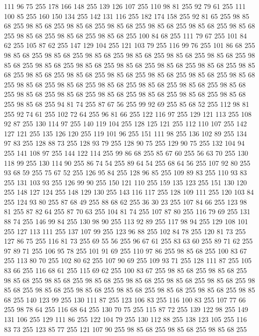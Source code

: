 111 96 75 255 178 166 148 255 139 126 107 255 110 98 81 255 92 79 61 255 111 100 85 255 160 150 134 255 142 131 116 255 182 174 158 255 92 81 65 255 98 85 68 255 98 85 68 255 98 85 68 255 98 85 68 255 98 85 68 255 98 85 68 255 98 85 68 255 98 85 68 255 98 85 68 255 98 85 68 255 100 84 68 255 111 79 67 255 101 84 62 255 105 87 62 255 147 129 104 255 121 103 79 255 116 99 76 255 101 86 68 255 98 85 68 255 98 85 68 255 98 85 68 255 98 85 68 255 98 85 68 255 98 85 68 255 98 85 68 255 98 85 68 255 98 85 68 255 98 85 68 255 98 85 68 255 98 85 68 255 98 85 68 255 98 85 68 255 98 85 68 255 98 85 68 255 98 85 68 255 98 85 68 255 98 85 68 255 98 85 68 255 98 85 68 255 98 85 68 255 98 85 68 255 98 85 68 255 98 85 68 255 98 85 68 255 98 85 68 255 98 85 68 255 98 85 68 255 98 85 68 255 98 85 68 255 98 85 68 255 94 81 74 255 87 67 56 255 99 92 69 255 85 68 52 255
112 98 81 255 92 74 61 255 102 72 64 255 96 81 66 255 122 116 97 255 129 121 113 255 108 92 87 255 130 114 97 255 140 119 104 255 128 125 121 255 112 110 107 255 142 127 121 255 135 126 120 255 119 101 96 255 151 111 98 255 136 102 89 255 134 97 83 255 128 88 73 255 128 93 79 255 128 90 75 255 129 90 75 255 132 104 94 255 141 108 97 255 144 122 114 255 99 86 68 255 85 67 60 255 56 63 70 255 130 118 99 255 130 114 90 255 86 74 54 255 89 64 54 255 68 64 56 255 107 92 80 255 93 68 59 255 75 67 52 255 126 95 84 255 128 96 85 255 109 89 83 255 110 93 83 255 131 103 93 255 126 99 90 255 150 121 110 255 159 135 123 255 151 130 120 255 148 127 124 255 148 129 130 255 143 116 117 255 128 109 111 255 120 103 84 255 124 93 80 255 87 68 49 255 88 68 62 255 36 30 23 255 107 84 66 255 123 98 81 255 87 82 64 255 87 70 63 255 104 81 74 255 107 87 80 255 116 79 69 255 131 88 74 255 146 99 84 255 130 98 90 255 113 92 89 255
117 98 94 255 129 108 101 255 127 113 111 255 137 107 99 255 123 96 88 255 102 84 78 255 120 81 73 255 127 86 75 255 116 81 73 255 69 55 56 255 96 67 61 255 83 63 60 255 89 71 62 255 97 89 71 255 106 95 78 255 101 91 69 255 110 97 86 255 98 85 68 255 100 83 67 255 113 80 70 255 102 80 62 255 107 90 69 255 109 93 71 255 128 111 87 255 105 83 66 255 116 68 61 255 115 69 62 255 100 83 67 255 98 85 68 255 98 85 68 255 98 85 68 255 98 85 68 255 98 85 68 255 98 85 68 255 98 85 68 255 98 85 68 255 98 85 68 255 98 85 68 255 98 85 68 255 98 85 68 255 98 85 68 255 98 85 68 255 98 85 68 255 140 123 99 255 130 111 87 255 123 106 83 255 116 100 83 255 107 77 66 255 98 78 64 255 116 68 64 255 130 70 75 255 115 87 72 255 139 122 98 255 149 131 106 255 129 111 86 255 122 104 79 255 130 112 88 255 138 123 105 255 116 83 73 255 123 85 77 255 121 107 90 255 98 85 68 255 98 85 68 255 98 85 68 255
